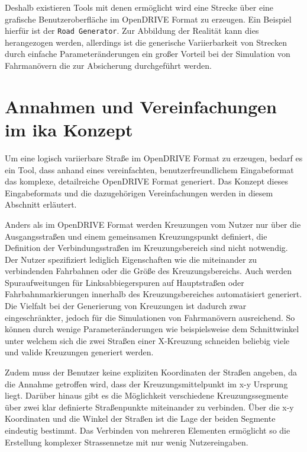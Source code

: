 Deshalb existieren Tools mit denen ermöglicht wird eine Strecke über eine grafische Benutzeroberfläche im OpenDRIVE Format zu erzeugen. Ein Beispiel hierfür ist der \texttt{Road Generator}.\cite{RoadGenerator.2019} Zur Abbildung der Realität kann dies herangezogen werden, allerdings ist die generische Variierbarkeit von Strecken durch einfache Parameteränderungen ein großer Vorteil bei der Simulation von Fahrmanövern die zur Absicherung durchgeführt werden. 

\chapter{Annahmen und Vereinfachungen im ika Konzept}

Um eine logisch variierbare Straße im OpenDRIVE Format zu erzeugen, bedarf es ein Tool, dass anhand eines vereinfachten, benutzerfreundlichem Eingabeformat das komplexe, detailreiche OpenDRIVE Format generiert. Das Konzept dieses Eingabeformats und die dazugehörigen Vereinfachungen werden in diesem Abschnitt erläutert.

Anders als im OpenDRIVE Format werden Kreuzungen vom Nutzer nur über die Ausgangsstraßen und einem gemeinsamen Kreuzungspunkt definiert, die Definition der Verbindungsstraßen im Kreuzungsbereich sind nicht notwendig. Der Nutzer spezifiziert lediglich Eigenschaften wie die miteinander zu verbindenden Fahrbahnen oder die Größe des Kreuzungsbereichs. Auch werden Spuraufweitungen für Linksabbiegerspuren auf Hauptstraßen oder Fahrbahnmarkierungen innerhalb des Kreuzungsbereiches automatisiert generiert. Die Vielfalt bei der Generierung von Kreuzungen ist dadurch zwar eingeschränkter, jedoch für die Simulationen von Fahrmanövern ausreichend. So können durch wenige Parameteränderungen wie beispielsweise dem Schnittwinkel unter welchem sich die zwei Straßen einer X-Kreuzung schneiden beliebig viele und valide Kreuzungen generiert werden. 

Zudem muss der Benutzer keine expliziten Koordinaten der Straßen angeben, da die Annahme getroffen wird, dass der Kreuzungsmittelpunkt im x-y Ursprung liegt. Darüber hinaus gibt es die Möglichkeit verschiedene Kreuzungssegmente über zwei klar definierte Straßenpunkte miteinander zu verbinden. Über die x-y Koordinaten und die Winkel der Straßen ist die Lage der beiden Segmente eindeutig bestimmt. Das Verbinden von mehreren Elementen ermöglicht so die Erstellung komplexer Strassennetze mit nur wenig Nutzereingaben.


